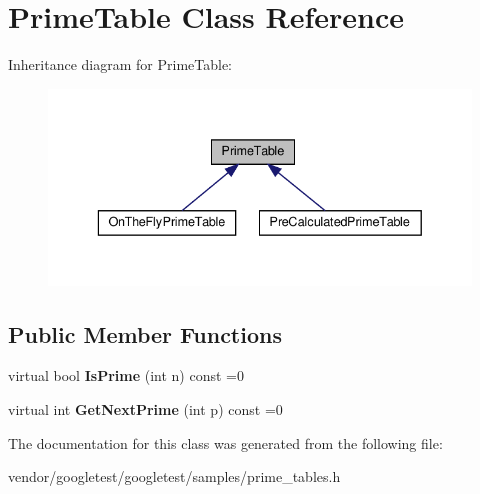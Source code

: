 \hypertarget{class_prime_table}{}\section{Prime\+Table Class Reference}
\label{class_prime_table}


Inheritance diagram for Prime\+Table\+:
\nopagebreak
\begin{figure}[H]
\begin{center}
\leavevmode
\includegraphics[width=336pt]{class_prime_table__inherit__graph}
\end{center}
\end{figure}
\subsection*{Public Member Functions}
\begin{DoxyCompactItemize}
\item 
\mbox{\label{class_prime_table_a2ab9243364ded0c51541f641b2df362a}} 
virtual bool {\bfseries Is\+Prime} (int n) const =0
\item 
\mbox{\label{class_prime_table_ae537c939f56617d8937d57bbbae3ab30}} 
virtual int {\bfseries Get\+Next\+Prime} (int p) const =0
\end{DoxyCompactItemize}


The documentation for this class was generated from the following file\+:\begin{DoxyCompactItemize}
\item 
vendor/googletest/googletest/samples/prime\+\_\+tables.\+h\end{DoxyCompactItemize}
